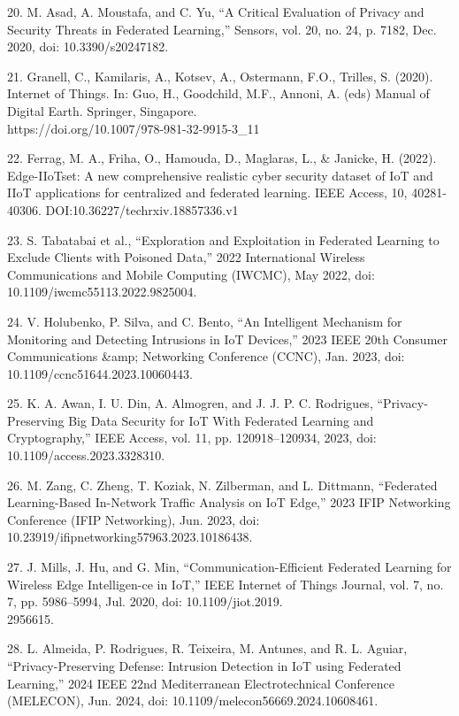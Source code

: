 \begin{noparindent}
20. M. Asad, A. Moustafa, and C. Yu, ``A Critical Evaluation of Privacy
and Security Threats in Federated Learning,'' Sensors, vol. 20, no. 24,
p. 7182, Dec. 2020, doi: 10.3390/s20247182.

21. Granell, C., Kamilaris, A., Kotsev, A., Ostermann, F.O., Trilles, S.
(2020). Internet of Things. In: Guo, H., Goodchild, M.F., Annoni, A.
(eds) Manual of Digital Earth. Springer, Singapore.
\\https://doi.org/10.1007/978-981-32-9915-3\_11

22. Ferrag, M. A., Friha, O., Hamouda, D., Maglaras, L., \& Janicke, H.
(2022). Edge-IIoTset: A new comprehensive realistic cyber security
dataset of IoT and IIoT applications for centralized and federated
learning. IEEE Access, 10, 40281-40306.
DOI:10.36227/techrxiv.18857336.v1

23. S. Tabatabai et al., ``Exploration and Exploitation in Federated
Learning to Exclude Clients with Poisoned Data,'' 2022 International
Wireless Communications and Mobile Computing (IWCMC), May 2022, doi:
10.1109/iwcmc55113.2022.9825004.

24. V. Holubenko, P. Silva, and C. Bento, ``An Intelligent Mechanism for
Monitoring and Detecting Intrusions in IoT Devices,'' 2023 IEEE 20th
Consumer Communications \&amp; Networking Conference (CCNC), Jan. 2023,
doi: 10.1109/ccnc51644.2023.10060443.

25. K. A. Awan, I. U. Din, A. Almogren, and J. J. P. C. Rodrigues,
``Privacy-Preserving Big Data Security for IoT With Federated Learning
and Cryptography,'' IEEE Access, vol. 11, pp. 120918--120934, 2023, doi:
10.1109/access.2023.3328310.

26. M. Zang, C. Zheng, T. Koziak, N. Zilberman, and L. Dittmann,
``Federated Learning-Based In-Network Traffic Analysis on IoT Edge,''
2023 IFIP Networking Conference (IFIP Networking), Jun. 2023, doi:
10.23919/ifipnetworking57963.2023.10186438.

27. J. Mills, J. Hu, and G. Min, ``Communication-Efficient Federated
Learning for Wireless Edge Intelligen-ce in IoT,'' IEEE Internet of
Things Journal, vol. 7, no. 7, pp. 5986--5994, Jul. 2020, doi:
10.1109/jiot.2019.\\2956615.

28. L. Almeida, P. Rodrigues, R. Teixeira, M. Antunes, and R. L. Aguiar,
``Privacy-Preserving Defense: Intrusion Detection in IoT using Federated
Learning,'' 2024 IEEE 22nd Mediterranean Electrotechnical Conference
(MELECON), Jun. 2024, doi: 10.1109/melecon56669.2024.10608461.


\end{noparindent}
